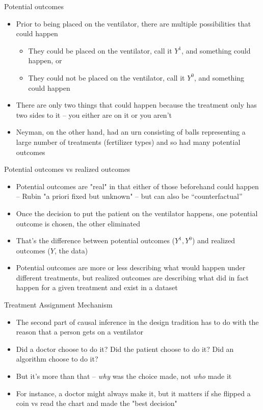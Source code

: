 \documentclass{beamer}
\begin{document}
\begin{frame}{Potential outcomes}

  \begin{itemize}
  \item Prior to being placed on the ventilator, there are multiple possibilities that could happen
		\begin{itemize}
		\item They could be placed on the ventilator, call it $Y^1$, and something could happen, or
		\item They could not be placed on the ventilator, call it $Y^0$, and something could happen
		\end{itemize}
\item There are only two things that could happen because the treatment only has two sides to it -- you either are on it or you aren't
\item Neyman, on the other hand, had an urn consisting of balls representing a large number of treatments (fertilizer types) and so had many potential outcomes

\end{itemize}

\end{frame}

\begin{frame}{Potential outcomes vs realized outcomes}
	\begin{itemize}
	\item Potential outcomes are "real" in that either of those beforehand could happen -- Rubin "a priori fixed but unknown" -- but can also be ``counterfactual''
	\item Once the decision to put the patient on the ventilator happens, one potential outcome is chosen, the other eliminated
	\item That's the difference between potential outcomes ($Y^1, Y^0$) and realized outcomes ($Y$, the data)
	\item Potential outcomes are more or less describing what would happen under different treatments, but realized outcomes are describing what did in fact happen for a given treatment and exist in a dataset
  \end{itemize}
\end{frame}


\begin{frame}{Treatment Assignment Mechanism }

\begin{itemize}
\item The second part of causal inference in the design tradition has to do with the reason that a person gets on a ventilator
\item Did a doctor choose to do it?  Did the patient choose to do it?  Did an algorithm choose to do it?
\item But it's more than that -- \emph{why} was the choice made, not \emph{who} made it
\item For instance, a doctor might always make it, but it matters if she flipped a coin vs read the chart and made the "best decision"
\end{itemize}
\end{frame}
\end{document}
